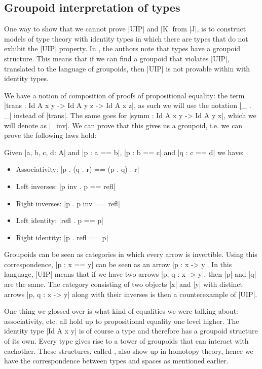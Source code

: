 \subsection{Groupoid interpretation of types}
\label{sec:groupoid}

One way to show that we cannot prove |UIP| and |K| from |J|, is to
construct models of type theory with identity types in which there are
types that do not exhibit the |UIP| property. In
\cite{groupoidinterpretation}, the authors note that types have a
groupoid structure. This means that if we can find a groupoid that
violates |UIP|, translated to the language of groupoids, then |UIP| is
not provable within \MLTT with identity types.

We have a notion of composition of proofs of propositional equality:
the term |trans : Id A x y -> Id A y z -> Id A x z|, as such we will
use the notation |_ . _| instead of |trans|. The same goes for |symm :
Id A x y -> Id A y x|, which we will denote as |_inv|. We can prove
that this gives us a groupoid, i.e. we can prove the following laws
hold:

Given |a, b, c, d: A| and |p : a == b|, |p : b == c| and |q : c == d|
we have:

\begin{itemize}
\item Associativity: |p . (q . r) == (p . q) . r|
\item Left inverses: |p inv . p == refl|
\item Right inverses: |p . p inv == refl|
\item Left identity: |refl . p == p|
\item Right identity: |p . refl == p|
\end{itemize}

Groupoids can be seen as categories in which every arrow is
invertible. Using this correspondence, |p : x == y| can be seen as an
arrow |p : x -> y|. In this language, |UIP| means that if we have two
arrows |p, q : x -> y|, then |p| and |q| are the same. The category
consisting of two objects |x| and |y| with distinct arrows |p, q : x
-> y| along with their inverses is then a counterexample of |UIP|.

One thing we glossed over is what kind of equalities we were talking
about: associativity, etc. all hold up to propositional equality one
level higher. The identity type |Id A x y| is of course a type and
therefore has a groupoid structure of its own. Every type gives rise
to a tower of groupoids that can interact with eachother. These
structures, called \inftygrpds, also show up in homotopy theory, hence
we have the correspondence between types and spaces as mentioned
earlier.

